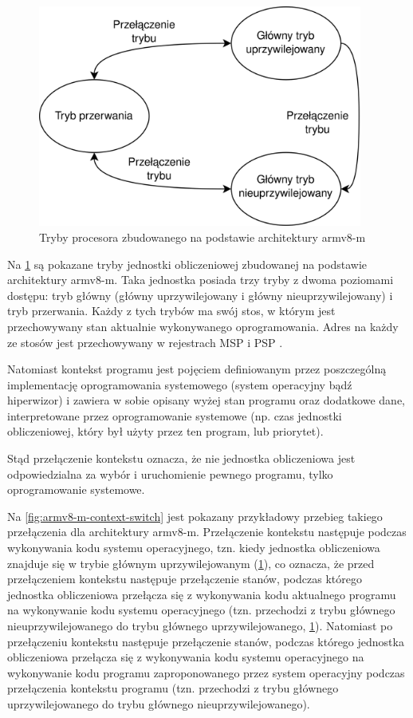 \documentclass[../main]{subfiles}
\begin{document}
\begin{figure}[h]
    \centering
    \includegraphics[width=0.95\textwidth]{Images/armv8m-modes.png}
    \caption{Tryby procesora zbudowanego na podstawie architektury \acrshort{arm}v8-\acrshort{m}
    \cite{armv8mintro}}
    \label{fig:armv8-m-modes}
\end{figure}

Na \cref{fig:armv8-m-modes} są pokazane tryby jednostki obliczeniowej zbudowanej na podstawie
architektury \acrshort{arm}v8-\acrshort{m}. Taka jednostka posiada trzy tryby z dwoma poziomami
dostępu: tryb główny (główny uprzywilejowany i główny nieuprzywilejowany) i tryb przerwania. Każdy z
tych trybów ma swój stos, w którym jest przechowywany stan aktualnie wykonywanego oprogramowania.
Adres na każdy ze stosów jest przechowywany w rejestrach MSP i PSP \cite{armv8mintro}.

Natomiast kontekst programu jest pojęciem definiowanym przez poszczególną implementację oprogramowania
systemowego (system operacyjny bądź hiperwizor) i zawiera w sobie opisany wyżej stan programu oraz
dodatkowe dane, interpretowane przez oprogramowanie systemowe (np. czas jednostki obliczeniowej, który
był użyty przez ten program, lub priorytet).

Stąd przełączenie kontekstu oznacza, że nie jednostka obliczeniowa jest odpowiedzialna za wybór i
uruchomienie pewnego programu, tylko oprogramowanie systemowe.

Na \cref{fig:armv8-m-context-switch} jest pokazany przykładowy przebieg takiego przełączenia dla
architektury \acrshort{arm}v8-\acrshort{m}. Przełączenie kontekstu następuje podczas wykonywania kodu
systemu operacyjnego, tzn. kiedy jednostka obliczeniowa znajduje się w trybie głównym uprzywilejowanym
(\cref{fig:armv8-m-modes}), co oznacza, że przed przełączeniem kontekstu następuje przełączenie
stanów, podczas którego jednostka obliczeniowa przełącza się z wykonywania kodu aktualnego programu na
wykonywanie kodu systemu operacyjnego (tzn. przechodzi z trybu głównego nieuprzywilejowanego do trybu
głównego uprzywilejowanego, \cref{fig:armv8-m-modes}). Natomiast po przełączeniu kontekstu następuje
przełączenie stanów, podczas którego jednostka obliczeniowa przełącza się z wykonywania kodu systemu
operacyjnego na wykonywanie kodu programu zaproponowanego przez system operacyjny podczas przełączenia
kontekstu programu (tzn. przechodzi z trybu głównego uprzywilejowanego do trybu głównego
nieuprzywilejowanego).
\end{document}
